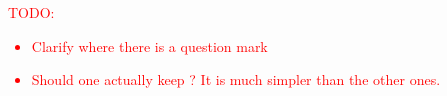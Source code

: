 \documentclass[preprint,9pt]{elsarticle}
\newcommand{\red}{\textcolor{red}}
\begin{document}

		\red{TODO: 
		\begin{itemize}
			\item Clarify where there is a question mark
			\item Should one actually keep \cite{MR3843884}? It is much simpler than the other ones.
		\end{itemize}}
\end{document}
